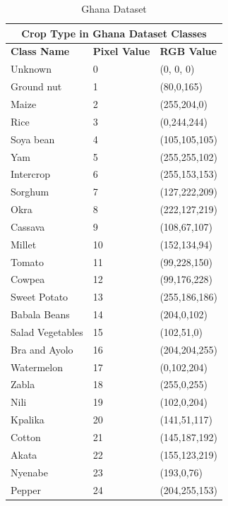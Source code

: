 \documentclass[sigconf, nonacm]{acmart}
\begin{document}
\begin{table}[htbp]
\centering
\caption{Ghana Dataset}
\begin{tabular}{|p{2.2cm}|p{0.7cm}|p{1.6cm}|}
 \hline
 \multicolumn{3}{|c|}{\textbf{Crop Type in Ghana Dataset Classes}} \\
 \hline
 \textbf{Class Name} & \textbf{Pixel Value}& \textbf{RGB Value} \\
 \hline
  Unknown & 0  &  (0, 0, 0)\\ 
 \hline
  Ground nut & 1  & (80,0,165) \\ 
 \hline
  Maize & 2  & (255,204,0) \\ 
 \hline
  Rice & 3  & (0,244,244)\\ 
 \hline
  Soya bean & 4  & (105,105,105)\\ 
 \hline
  Yam & 5  & (255,255,102) \\ 
 \hline
  Intercrop & 6  & (255,153,153)\\ 
 \hline
  Sorghum & 7  & (127,222,209)\\ 
 \hline
  Okra & 8  & (222,127,219)\\ 
 \hline
  Cassava & 9  & (108,67,107)\\ 
 \hline
  Millet & 10  & (152,134,94)\\ 
 \hline
  Tomato & 11 & (99,228,150) \\ 
 \hline
  Cowpea & 12  & (99,176,228)\\ 
 \hline
  Sweet Potato & 13 & (255,186,186)\\ 
 \hline
  Babala Beans & 14  & (204,0,102) \\ 
 \hline
  Salad Vegetables & 15  & (102,51,0)\\ 
 \hline
  Bra and Ayolo  & 16  & (204,204,255)\\ 
 \hline
  Watermelon & 17  & (0,102,204)\\ 
 \hline
  Zabla & 18 & (255,0,255)\\ 
 \hline
  Nili & 19 & (102,0,204)\\ 
 \hline
  Kpalika & 20 & (141,51,117)\\ 
 \hline
  Cotton & 21 & (145,187,192)\\ 
 \hline
  Akata & 22 & (155,123,219)\\ 
 \hline
  Nyenabe & 23 & (193,0,76)\\ 
 \hline
  Pepper & 24 & (204,255,153)\\ 
 \hline
\end{tabular}
\label{ghana_dataset_class_table}
\end{table}
\end{document}
